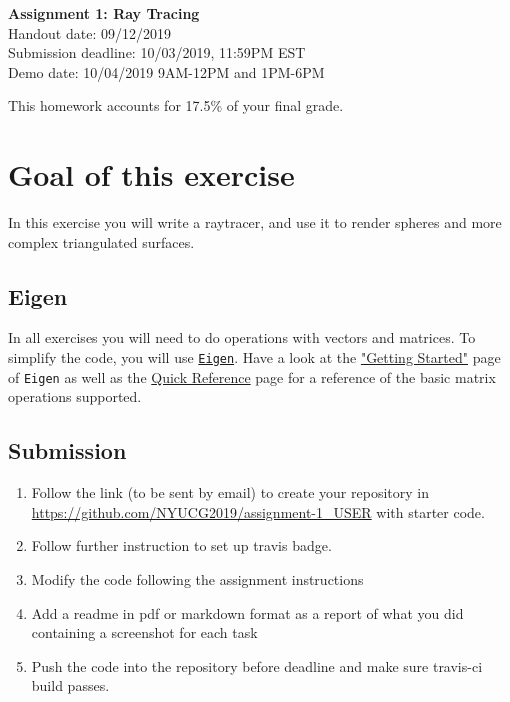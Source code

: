 \documentclass[11pt]{article}
\begin{document}
\hspace{50pt}

\begin{center}

{\Huge \textbf{Assignment 1: Ray Tracing}}\\
\vspace{10pt}
Handout date: 09/12/2019\\
Submission deadline: 10/03/2019, 11:59PM EST\\
Demo date: 10/04/2019 9AM-12PM and 1PM-6PM 
\end{center}

\noindent This homework accounts for 17.5\% of your final grade. 

\section*{Goal of this exercise}
In this exercise you will write a raytracer, and use it to render spheres and more complex triangulated surfaces.

\subsection*{Eigen}
In all exercises you will need to do operations with vectors and matrices. To simplify the code, you will use \href{http://eigen.tuxfamily.org/}{\texttt{Eigen}}. 
Have a look at the \href{http://eigen.tuxfamily.org/dox/GettingStarted.html}{"Getting Started"} page of \texttt{Eigen} as well as the \href{http://eigen.tuxfamily.org/dox/group__QuickRefPage.html}{Quick Reference} page for a reference of the basic matrix operations supported. 

\subsection*{Submission}

\begin{enumerate}
\item Follow the link (to be sent by email) to create your repository in \url{https://github.com/NYUCG2019/assignment-1_USER} with starter code.
\item Follow further instruction to set up travis badge.
\item Modify the code following the assignment instructions
\item Add a readme in pdf or markdown format as a report of what you did containing a screenshot for each task
\item Push the code into the repository before deadline and make sure travis-ci build passes.
\end{enumerate}
\end{document}
